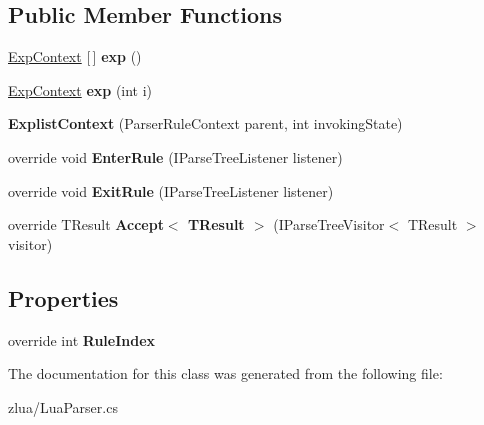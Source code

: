 \subsection*{Public Member Functions}
\begin{DoxyCompactItemize}
\item 
\mbox{\label{classzlua_1_1_lua_parser_1_1_explist_context_aa0b980d461da890c56a59f8cbacd1052}} 
\mbox{\hyperlink{classzlua_1_1_lua_parser_1_1_exp_context}{Exp\+Context}} \mbox{[}$\,$\mbox{]} {\bfseries exp} ()
\item 
\mbox{\label{classzlua_1_1_lua_parser_1_1_explist_context_a461f6d5e3b103152e90ec4c59ea163dd}} 
\mbox{\hyperlink{classzlua_1_1_lua_parser_1_1_exp_context}{Exp\+Context}} {\bfseries exp} (int i)
\item 
\mbox{\label{classzlua_1_1_lua_parser_1_1_explist_context_a2b4a17f2475dafff00945c68272e3ea4}} 
{\bfseries Explist\+Context} (Parser\+Rule\+Context parent, int invoking\+State)
\item 
\mbox{\label{classzlua_1_1_lua_parser_1_1_explist_context_a1a8806cd4e6691952eb5542f51e5c854}} 
override void {\bfseries Enter\+Rule} (I\+Parse\+Tree\+Listener listener)
\item 
\mbox{\label{classzlua_1_1_lua_parser_1_1_explist_context_a9461c28bf898cc673cebeff271315b2b}} 
override void {\bfseries Exit\+Rule} (I\+Parse\+Tree\+Listener listener)
\item 
\mbox{\label{classzlua_1_1_lua_parser_1_1_explist_context_a149432b9718df4e6b3617aa530f54e77}} 
override T\+Result {\bfseries Accept$<$ T\+Result $>$} (I\+Parse\+Tree\+Visitor$<$ T\+Result $>$ visitor)
\end{DoxyCompactItemize}
\subsection*{Properties}
\begin{DoxyCompactItemize}
\item 
\mbox{\label{classzlua_1_1_lua_parser_1_1_explist_context_ad0cb06f2973e4aad5bf47b67723fe347}} 
override int {\bfseries Rule\+Index}
\end{DoxyCompactItemize}


The documentation for this class was generated from the following file\+:\begin{DoxyCompactItemize}
\item 
zlua/Lua\+Parser.\+cs\end{DoxyCompactItemize}
